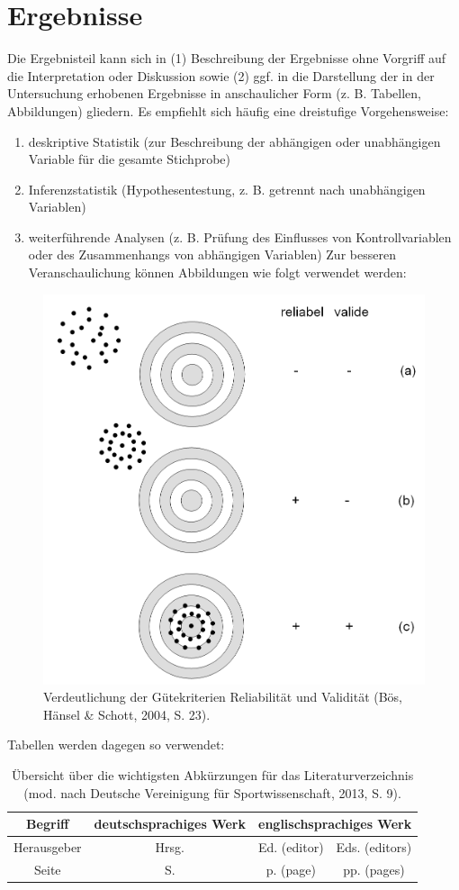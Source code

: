 \chapter{Ergebnisse}
Die Ergebnisteil kann sich in (1) Beschreibung der Ergebnisse ohne Vorgriff auf die Interpretation oder Diskussion sowie (2) ggf. in die Darstellung der in der Untersuchung erhobenen Ergebnisse in anschaulicher Form (z. B. Tabellen, Abbildungen) gliedern. Es empfiehlt sich häufig eine dreistufige Vorgehensweise:
\begin{enumerate}
	\item deskriptive Statistik (zur Beschreibung der abhängigen oder unabhängigen Variable für die gesamte Stichprobe)
	\item Inferenzstatistik (Hypothesentestung, z. B. getrennt nach unabhängigen Variablen)
	\item weiterführende Analysen (z. B. Prüfung des Einflusses von Kontrollvariablen oder des Zusammenhangs von abhängigen Variablen)
	Zur besseren Veranschaulichung können Abbildungen wie folgt verwendet werden:	
\end{enumerate}
\begin{figure}[h]
	\centering
	\includegraphics[width=0.7\linewidth]{images/guetekriterien-reliabilitaet-und-variabilitaet}
	\caption{Verdeutlichung der Gütekriterien Reliabilität und Validität (Bös, Hänsel \& Schott, 2004, S. 23).}
	\label{fig:guetekriterien-reliabilitaet-und-variabilitaet}
\end{figure}
Tabellen werden dagegen so verwendet:
\begin{table}
	\caption{Übersicht über die wichtigsten Abkürzungen für das Literaturverzeichnis (mod. nach Deutsche Vereinigung für Sportwissenschaft, 2013, S. 9).}
	\label{tab:uebersicht-wichtigste-abkuerzungen}
	\begin{tabular}{|c|c|c|c|}
		\hline
		Begriff & deutschsprachiges Werk & \multicolumn{2}{c|}{englischsprachiges Werk}\\
		\hline
		Herausgeber & Hrsg. & Ed. (editor) & Eds. (editors) \\
		\hline
		Seite & S. & p. (page) & pp. (pages) \\
		\hline
	\end{tabular}
\end{table}
